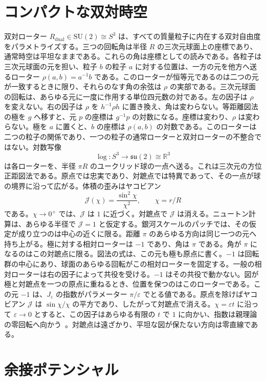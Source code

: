 \documentclass[a4paper]{article}
\begin{document}
\section{コンパクトな双対時空}
\label{sec:compact}

双対ローター $R_{\text{dual}} \in \mathrm{SU}(2) \cong S^3$ は、すべての質量粒子に内在する双対自由度をパラメトライズする。三つの回転角は半径 $R$ の三次元球面上の座標であり、通常時空は平坦なままである。これらの角は座標としての読みである。各粒子は三次元球面の元を担い、粒子 $b$ の粒子 $a$ に対する位置は、一方の元を他方へ送るローター $\rho(a,b)=a^{-1}b$ である。このローターが恒等元であるのは二つの元が一致するときに限り、それらのなす角の余弦は $\rho$ の実部である。三次元球面の回転は、あらゆる元に一度に作用する単位四元数の対である。左の因子は $\rho$ を変えない。右の因子は $\rho$ を $h^{-1}\rho h$ に置き換え、角は変わらない。等距離図法の極を $g$ へ移すと、元 $p$ の座標は $g^{-1}p$ の対数になる。座標は変わり、$\rho$ は変わらない。極を $a$ に置くと、$b$ の座標は $\rho(a,b)$ の対数である。このローターは二つの粒子の関係であり、一つの粒子の通常ローターと双対ローターの不整合ではない。対数写像
\[
\log : S^3 \to \mathfrak{su}(2) \cong \mathbb{R}^3
\]
は各ローターを、半径 $\pi R$ のユークリッド球の一点へ送る。これは三次元の方位正距図法である。原点では忠実であり、対蹠点では特異であって、その一点が球の境界に沿って広がる。体積の歪みはヤコビアン
\[
\mathcal{J}(\chi) = \frac{\sin^2 \chi}{\chi^2}, \qquad \chi = r/R
\]
である。$\chi \to 0^+$ では、$\mathcal{J}$ は $1$ に近づく。対蹠点で $\mathcal{J}$ は消える。ニュートン計算は、あらゆる半径で $\mathcal{J}=1$ と仮定する。銀河スケールのパッチでは、その仮定が成り立つのは中心の近くに限る。距離 $\pi$ のあらゆる方向は同じ一つの元へ持ち上がる。極に対する相対ローターは $-1$ であり、角は $\pi$ である。角が $\pi$ になるのはこの対蹠点に限る。図法の式は、この元も極も原点に書く。$-1$ は回転群の中心にあり、球面のあらゆる回転がこの相対ローターを固定する。一般の相対ローターは右の因子によって共役を受ける。$-1$ はその共役で動かない。図が極と対蹠点を一つの原点に重ねるとき、位置を保つのはこのローターである。この元 $-1$ は、$J_\varepsilon$ の指数がパラメーター $\pi/\varepsilon$ でとる値である。原点を除けばヤコビアン $\mathcal{J}$ は $\sin\chi/\chi$ の平方であり、したがって対蹠点で消える。$\chi=\varepsilon t$ に沿って $\varepsilon\to 0$ とすると、この因子はあらゆる有限の $t$ で $1$ に向かい、指数は親理論の零回転へ向かう~\cite{dst-main}。対蹠点は遠ざかり、平坦な図が保たない方向は零直線である。

\section{余接ポテンシャル}
\label{sec:cotangent}
\end{document}
